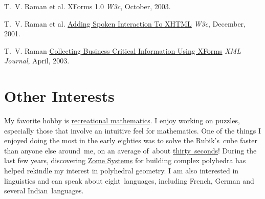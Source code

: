 \documentclass{article}
\begin{document}
\begin{compactitem}{}
\item   T.~V.  Raman et al.  
 XForms 1.0 
 \emph{W3c}, October, 2003.  
%  
\item   T.~V.  Raman et al.  
  \href{http://www.w3.org/tr/xml-events}{Adding Spoken Interaction To XHTML} 
 \emph{W3c}, December, 2001.  
\item   T.~V.  Raman 
 \href{http://www.sys-con.com/xml/article.cfm?id=578}%
{Collecting Business Critical Information Using XForms} 
  \emph{XML Journal}, April, 2003.
\end{compactitem}

\begin{center}
  \end{center}




\section*{Other Interests}
My favorite hobby is
\href{http://www.cs.cornell.edu/home/raman/publications/polyhedra}%
{recreational mathematics}.  I enjoy working on puzzles,
especially those that involve an intuitive feel for mathematics.
One of the things I enjoyed doing the most in the early eighties
was to solve the Rubik's~cube faster than anyone else around~me,
on an average of~about 
\href{http://video.google.com/videoplay?docid=-4180435763269825467}{thirty~seconds}!  During the last few
years, discovering
\href{http://emacspeak.sf.net/raman/publications/polyhedra/}{Zome
  Systems} for building complex polyhedra has helped rekindle my
interest in polyhedral geometry.  I am also interested in
linguistics and can speak about eight~languages, including
French, German and several Indian~languages.
\end{document}
